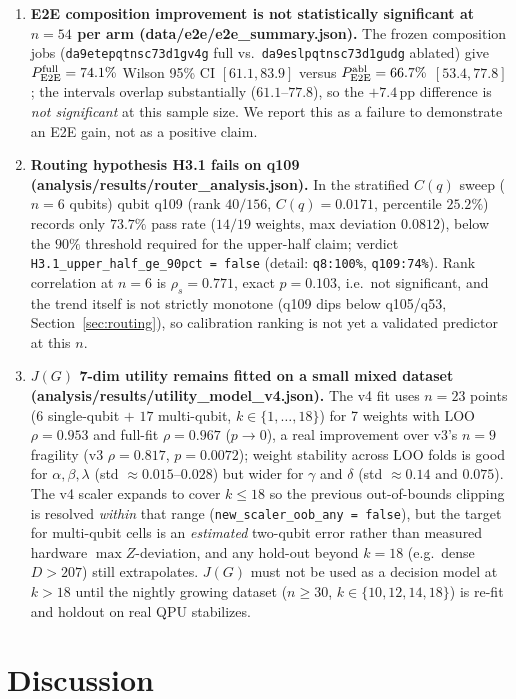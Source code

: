 ﻿\documentclass[12pt,a4paper]{article}
\begin{document}
\begin{enumerate}[leftmargin=2em]
    \item \textbf{E2E composition improvement is not statistically significant at $n{=}54$ per arm (data/e2e/e2e\_summary.json).} The frozen composition jobs (\texttt{da9etepqtnsc73d1gv4g} full vs.\ \texttt{da9eslpqtnsc73d1gudg} ablated) give $P_{\rm E2E}^{\rm full}=74.1\%$ Wilson 95\% CI $[61.1,83.9]$ versus $P_{\rm E2E}^{\rm abl}=66.7\%$ $[53.4,77.8]$; the intervals overlap substantially ($61.1$--$77.8$), so the $+7.4$\,pp difference is \emph{not significant} at this sample size. We report this as a failure to demonstrate an E2E gain, not as a positive claim.
    \item \textbf{Routing hypothesis H3.1 fails on q109 (analysis/results/router\_analysis.json).} In the stratified $C(q)$ sweep ($n{=}6$ qubits) qubit q109 (rank $40/156$, $C(q)=0.0171$, percentile $25.2\%$) records only $73.7\%$ pass rate ($14/19$ weights, max deviation $0.0812$), below the $90\%$ threshold required for the upper-half claim; verdict \texttt{H3.1\_upper\_half\_ge\_90pct = false} (detail: \texttt{q8:100\%}, \texttt{q109:74\%}). Rank correlation at $n{=}6$ is $\rho_s=0.771$, exact $p=0.103$, i.e.\ not significant, and the trend itself is not strictly monotone (q109 dips below q105/q53, Section~\ref{sec:routing}), so calibration ranking is not yet a validated predictor at this $n$.
    \item \textbf{$J(G)$ 7-dim utility remains fitted on a small mixed dataset (analysis/results/utility\_model\_v4.json).} The v4 fit uses $n{=}23$ points ($6$ single-qubit $+$ $17$ multi-qubit, $k\in\{1,\dots,18\}$) for 7 weights with LOO $\rho=0.953$ and full-fit $\rho=0.967$ ($p\to 0$), a real improvement over v3's $n{=}9$ fragility (v3 $\rho=0.817$, $p=0.0072$); weight stability across LOO folds is good for $\alpha,\beta,\lambda$ (std $\approx 0.015$--$0.028$) but wider for $\gamma$ and $\delta$ (std $\approx 0.14$ and $0.075$). The v4 scaler expands to cover $k\le 18$ so the previous out-of-bounds clipping is resolved \emph{within} that range (\texttt{new\_scaler\_oob\_any = false}), but the target for multi-qubit cells is an \emph{estimated} two-qubit error rather than measured hardware $\max Z$-deviation, and any hold-out beyond $k{=}18$ (e.g.\ dense $D{>}207$) still extrapolates. $J(G)$ must not be used as a decision model at $k{>}18$ until the nightly growing dataset ($n{\ge}30$, $k{\in}\{10,12,14,18\}$) is re-fit and holdout on real QPU stabilizes.
\end{enumerate}


\section{Discussion}\label{sec:discussion}
\end{document}
